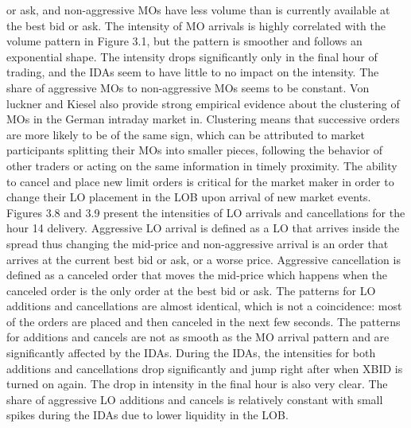 \documentclass[12pt,a4paper]{cau_thesis}
\begin{document}
or ask, and non-aggressive MOs have less volume than is currently
available at the best bid or ask. The intensity of MO arrivals is
highly correlated with the volume pattern in Figure 3.1, but the
pattern is smoother and follows an exponential shape. The intensity
drops significantly only in the final hour of trading, and the IDAs
seem to have little to no impact on the intensity. The share of
aggressive MOs to non-aggressive MOs seems to be constant. Von
luckner and Kiesel also provide strong empirical evidence about the
clustering of MOs in the German intraday market in. Clustering means
that successive orders are more likely to be of the same sign, which
can be attributed to market participants splitting their MOs into
smaller pieces, following the behavior of other traders or acting on
the same information in timely proximity. The ability to cancel and
place new limit orders is critical for the market maker in order to
change their LO placement in the LOB upon arrival of new market
events. Figures 3.8 and 3.9 present the intensities of LO arrivals
and cancellations for the hour 14 delivery. Aggressive LO arrival is
defined as a LO that arrives inside the spread thus changing the
mid-price and non-aggressive arrival is an order that arrives at the
current best bid or ask, or a worse price. Aggressive cancellation is
defined as a canceled order that moves the mid-price which happens
when the canceled order is the only order at the best bid or ask. The
patterns for LO additions and cancellations are almost identical,
which is not a coincidence: most of the orders are placed and then
canceled in the next few seconds. The patterns for additions and
cancels are not as smooth as the MO arrival pattern and are
significantly affected by the IDAs. During the IDAs, the intensities
for both additions and cancellations drop significantly and jump
right after when XBID is turned on again. The drop in intensity in
the final hour is also very clear. The share of aggressive LO
additions and cancels is relatively constant with small spikes during
the IDAs due to lower liquidity in the LOB.
\begin{figure}[htbp]
    \vspace*{0.5cm}
    \centering
    \label{fig:lo_ca_arrival_rates}
\end{figure}
\end{document}
